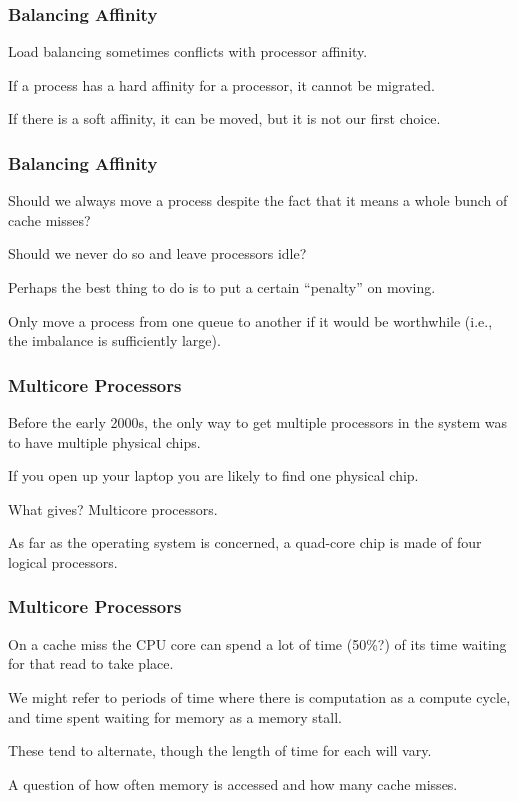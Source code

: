\begin{frame}
\frametitle{Balancing Affinity}

Load balancing sometimes conflicts with processor affinity. 

If a process has a hard affinity for a processor, it cannot be migrated. 

If there is a soft affinity, it can be moved, but it is not our first choice.

\end{frame}

\begin{frame}
\frametitle{Balancing Affinity}

Should we always move a process despite the fact that it means a whole bunch of cache misses?

Should we never do so and leave processors idle? 

Perhaps the best thing to do is to put a certain ``penalty'' on moving.

Only move a process from one queue to another if it would be worthwhile (i.e., the imbalance is sufficiently large).

\end{frame}

\begin{frame}
\frametitle{Multicore Processors}

Before the early 2000s, the only way to get multiple processors in the system was to have multiple physical chips. 

If you open up your laptop you are likely to find one physical chip. 

What gives? \alert{Multicore processors}. 

As far as the operating system is concerned, a quad-core chip is made of four logical processors.

\end{frame}

\begin{frame}
\frametitle{Multicore Processors}

On a cache miss the CPU core can spend a lot of time (50\%?) of its time waiting for that read to take place.

  We might refer to periods of time where there is computation as a compute cycle, and time spent waiting for memory as a \alert{memory stall}. 
  
  These tend to alternate, though the length of time for each will vary. 
  
  A question of how often memory is accessed and how many cache misses.

\end{frame}

